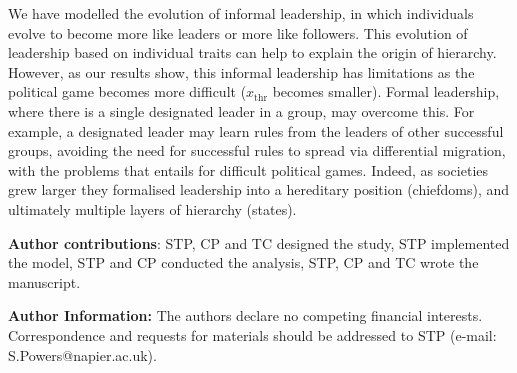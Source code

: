 \documentclass{rstb}
\begin{document}
\begin{linenumbers}
We have modelled the evolution of informal leadership, in which individuals evolve to become more like leaders or more like followers. This evolution of leadership based on individual traits can help to explain the origin of hierarchy. However, as our results show, this informal leadership has limitations as the political game becomes more difficult ($x_\mathrm{thr}$ becomes smaller). Formal leadership, where there is a single designated leader in a group, may overcome this. For example, a designated leader may learn rules from the leaders of other successful groups, avoiding the need for successful rules to spread via differential migration, with the problems that entails for difficult political games. Indeed, as societies grew larger they formalised leadership into a hereditary position (chiefdoms), and ultimately multiple layers of hierarchy (states).


















\textbf{Author contributions}: STP, CP and TC designed the study, STP implemented the model, STP and CP conducted the analysis, STP, CP and TC wrote the manuscript.

\textbf{Author Information:} The authors declare no competing financial interests. Correspondence and requests for materials should be addressed to STP (e-mail: S.Powers@napier.ac.uk).


\end{linenumbers}
\end{document}
